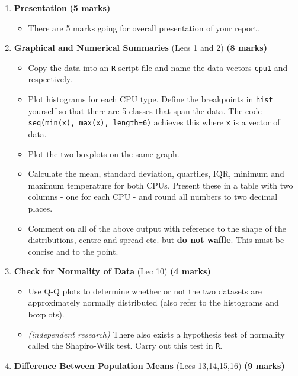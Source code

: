 \documentclass[12pt]{article}
\begin{document}
\begin{enumerate}[1)]
\item[] {\bf Presentation} \hfill{\scriptsize \bf (5 marks)}
\begin{itemize}
\item There are 5 marks going for overall presentation of your report.
\end{itemize}
\item {\bf Graphical and Numerical Summaries} (Lecs 1 and 2) \hfill{\scriptsize \bf (8 marks)}
\begin{itemize}
\item Copy the data into an \texttt{R} script file and name the data vectors \texttt{cpu1} and  respectively.
\item Plot histograms for each CPU type. Define the breakpoints in \texttt{hist} yourself so that there are 5 classes that span the data. The code \texttt{seq(min(x), max(x), length=6)} achieves this where \texttt{x} is a vector of data.
\item Plot the two boxplots on the same graph.
\item Calculate the mean, standard deviation, quartiles, IQR, minimum and maximum temperature for both CPUs. Present these in a table with two columns - one for each CPU - and round all numbers to two decimal places.
\item Comment on all of the above output with reference to the shape of the distributions, centre and spread etc. but {\bf do not waffle}. This must be concise and to the point.
\end{itemize}
\item {\bf Check for Normality of Data} (Lec 10) \hfill{\scriptsize \bf (4 marks)}
\begin{itemize}
\item Use Q-Q plots to determine whether or not the two datasets are approximately normally distributed (also refer to the histograms and boxplots).
\item \emph{(independent research)} There also exists a hypothesis test of normality called the Shapiro-Wilk test. Carry out this test in \texttt{R}. %
    \\[0.3cm]
\end{itemize}
\item {\bf Difference Between Population Means} (Lecs 13,14,15,16) \hfill{\scriptsize \bf (9 marks)}

\end{enumerate}
\end{document}
